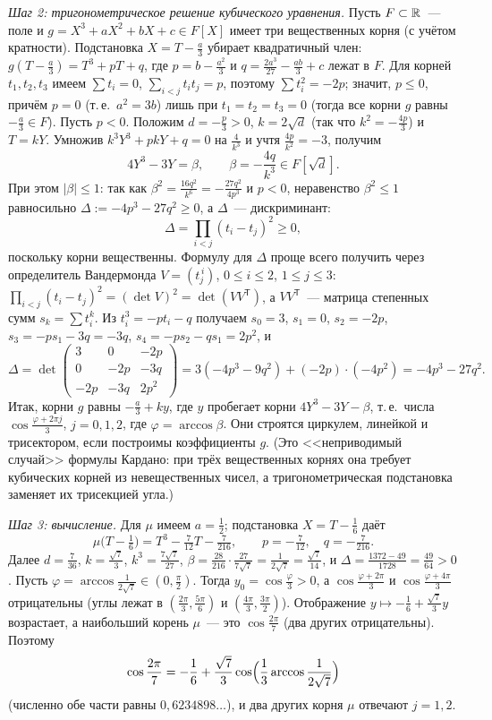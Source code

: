 \emph{Шаг 2: тригонометрическое решение кубического уравнения.} Пусть $F\subset\mathbb R$~--- поле и $g=X^3+aX^2+bX+c\in F[X]$
имеет три вещественных корня (с учётом кратности). Подстановка $X=T-\frac a3$ убирает квадратичный член:
$g(T-\frac a3)=T^3+pT+q$, где $p=b-\frac{a^2}3$ и $q=\frac{2a^3}{27}-\frac{ab}3+c$ лежат в $F$. Для корней $t_1,t_2,t_3$ имеем $\sum t_i=0$, $\sum_{i<j}t_it_j=p$, поэтому
$\sum t_i^2=-2p$; значит, $p\le0$, причём $p=0$ (т.\,е.\ $a^2=3b$) лишь при $t_1=t_2=t_3=0$ (тогда все корни $g$ равны
$-\frac a3\in F$).
Пусть $p<0$. Положим $d=-\frac p3>0$, $k=2\sqrt d$ (так что $k^2=-\frac{4p}3$) и $T=kY$. Умножив
$k^3Y^3+pkY+q=0$ на $\frac4{k^3}$ и учтя $\frac{4p}{k^2}=-3$, получим
\[
4Y^3-3Y=\beta,\qquad \beta=-\frac{4q}{k^3}\in F[\sqrt d].
\]
При этом $|\beta|\le1$: так как $\beta^2=\frac{16q^2}{k^6}=-\frac{27q^2}{4p^3}$ и $p<0$, неравенство $\beta^2\le1$
равносильно $\Delta:=-4p^3-27q^2\ge0$, а $\Delta$~--- дискриминант:
\[
\Delta=\prod_{i<j}(t_i-t_j)^2\ge0,
\]
поскольку корни вещественны. Формулу для $\Delta$ проще всего получить через определитель Вандермонда $V=(t_j^{\,i})$,
$0\le i\le2$, $1\le j\le3$: $\prod_{i<j}(t_i-t_j)^2=(\det V)^2=\det(VV^{\mathsf T})$, а $VV^{\mathsf T}$~--- матрица степенных
сумм $s_k=\sum t_i^k$. Из $t_i^3=-pt_i-q$ получаем $s_0=3$, $s_1=0$, $s_2=-2p$, $s_3=-ps_1-3q=-3q$, $s_4=-ps_2-qs_1=2p^2$, и
\[
\Delta=\det\begin{pmatrix}3&0&-2p\\0&-2p&-3q\\-2p&-3q&2p^2\end{pmatrix}=3(-4p^3-9q^2)+(-2p)\cdot(-4p^2)=-4p^3-27q^2 .
\]
Итак, корни $g$ равны $-\frac a3+ky$, где $y$ пробегает корни $4Y^3-3Y-\beta$, т.\,е.\ числа
$\cos\frac{\varphi+2\pi j}3$, $j=0,1,2$, где $\varphi=\arccos\beta$. Они строятся циркулем, линейкой и трисектором, если
построимы коэффициенты $g$. (Это <<неприводимый случай>> формулы Кардано: при трёх вещественных корнях она требует
кубических корней из невещественных чисел, а тригонометрическая подстановка заменяет их трисекцией угла.)

\emph{Шаг 3: вычисление.} Для $\mu$ имеем $a=\frac12$; подстановка $X=T-\frac16$ даёт
\[
\mu\bigl(T-\tfrac16\bigr)=T^3-\tfrac7{12}T-\tfrac7{216},\qquad p=-\tfrac7{12},\quad q=-\tfrac7{216}.
\]
Далее $d=\frac7{36}$, $k=\frac{\sqrt7}3$, $k^3=\frac{7\sqrt7}{27}$, $\beta=\frac{28}{216}\cdot\frac{27}{7\sqrt7}=\frac1{2\sqrt7}=\frac{\sqrt7}{14}$,
и $\Delta=\frac{1372-49}{1728}=\frac{49}{64}>0$. Пусть $\varphi=\arccos\frac1{2\sqrt7}\in(0,\frac\pi2)$. Тогда
$y_0=\cos\frac\varphi3>0$, а $\cos\frac{\varphi+2\pi}3$ и $\cos\frac{\varphi+4\pi}3$ отрицательны (углы лежат в
$(\frac{2\pi}3,\frac{5\pi}6)$ и $(\frac{4\pi}3,\frac{3\pi}2)$). Отображение $y\mapsto-\frac16+\frac{\sqrt7}3y$ возрастает, а
наибольший корень $\mu$~--- это $\cos\frac{2\pi}7$ (два других отрицательны). Поэтому
\[
\cos\frac{2\pi}7=-\frac16+\frac{\sqrt7}3\cos\Bigl(\frac13\arccos\frac1{2\sqrt7}\Bigr)
\]
(численно обе части равны $0{,}6234898\ldots$), и два других корня $\mu$ отвечают $j=1,2$.

